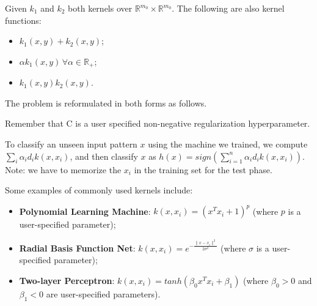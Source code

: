 Given $k_1$ and $k_2$ both kernels over $\mathbb{R}^{m_0} \times \mathbb{R}^{m_0}$. The following are also kernel functions:
\begin{itemize}
    \item $k_1(x,y) + k_2(x,y)$;
    \item $\alpha k_1(x,y) \, \forall \alpha \in \mathbb{R}_+$;
    \item $k_1(x,y)k_2(x,y)$.
\end{itemize}

The problem is reformulated in both forms as follows.


Remember that C is a user specified non-negative  regularization hyperparameter.

To classify an unseen input pattern $x$ using the machine we trained, we compute $\sum_i \alpha_i d_i k(x, x_i)$, and then classify $x$ as $h(x) = sign(\sum_{i=1}^n \alpha_i d_i k(x, x_i))$. Note: we have to memorize the $x_i$ in the training set for the test phase.

Some examples of commonly used kernels include:
\begin{itemize}
    \item \textbf{Polynomial Learning Machine}: $k(x,x_i) = (x^T x_i + 1)^p$ (where $p$ is a user-specified parameter);
    \item \textbf{Radial Basis Function Net}: $k(x, x_i) = e^{-\frac{\|x - x_i\|^2}{2 \sigma^2}}$ (where $\sigma$ is a user-specified parameter);
    \item \textbf{Two-layer Perceptron}: $k(x,x_i) = tanh(\beta_0 x^T x_i + \beta_1)$ (where $\beta_0 > 0$ and $\beta_1 < 0$ are user-specified parameters).
\end{itemize}

